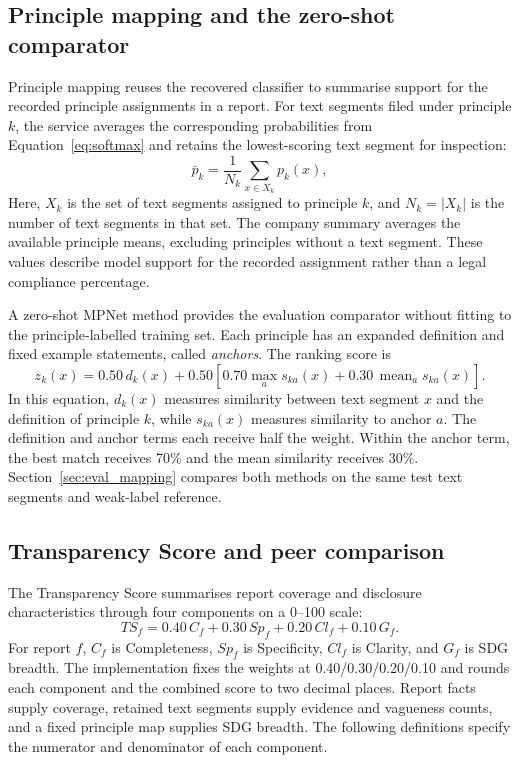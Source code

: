 \subsection{Principle mapping and the zero-shot comparator}
\label{sec:mapping}

Principle mapping reuses the recovered classifier to summarise support for the recorded principle assignments in a report. For text segments filed under principle $k$, the service averages the corresponding probabilities from Equation~\eqref{eq:softmax} and retains the lowest-scoring text segment for inspection:
\begin{equation}
\bar{p}_k=\frac{1}{N_k}\sum_{x\in X_k}p_k(x),
\label{eq:mapmean}
\end{equation}
Here, $X_k$ is the set of text segments assigned to principle $k$, and $N_k=|X_k|$ is the number of text segments in that set. The company summary averages the available principle means, excluding principles without a text segment. These values describe model support for the recorded assignment rather than a legal compliance percentage.

A zero-shot MPNet method provides the evaluation comparator without fitting to the principle-labelled training set. Each principle has an expanded definition and fixed example statements, called \emph{anchors}. The ranking score is
\begin{equation}
z_k(x)=0.50\,d_k(x)+0.50\left[0.70\max_a s_{ka}(x)+0.30\,\operatorname{mean}_a s_{ka}(x)\right].
\label{eq:hybrid}
\end{equation}
In this equation, $d_k(x)$ measures similarity between text segment $x$ and the definition of principle $k$, while $s_{ka}(x)$ measures similarity to anchor $a$. The definition and anchor terms each receive half the weight. Within the anchor term, the best match receives 70\% and the mean similarity receives 30\%. Section~\ref{sec:eval_mapping} compares both methods on the same test text segments and weak-label reference.

\subsection{Transparency Score and peer comparison}
\label{sec:score}

The Transparency Score summarises report coverage and disclosure characteristics through four components on a 0--100 scale:
\begin{equation}
TS_f=0.40\,C_f+0.30\,Sp_f+0.20\,Cl_f+0.10\,G_f.
\label{eq:ts}
\end{equation}
For report $f$, $C_f$ is Completeness, $Sp_f$ is Specificity, $Cl_f$ is Clarity, and $G_f$ is SDG breadth. The implementation fixes the weights at 0.40/0.30/0.20/0.10 and rounds each component and the combined score to two decimal places. Report facts supply coverage, retained text segments supply evidence and vagueness counts, and a fixed principle map supplies SDG breadth. The following definitions specify the numerator and denominator of each component.

